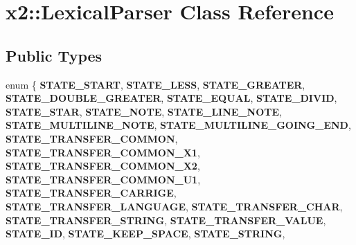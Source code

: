 \hypertarget{classx2_1_1_lexical_parser}{}\section{x2\+:\+:Lexical\+Parser Class Reference}
\label{classx2_1_1_lexical_parser}
\subsection*{Public Types}
\begin{DoxyCompactItemize}
\item 
\mbox{\label{classx2_1_1_lexical_parser_a0349435d24793ac365f23265c9ef49f1}} 
enum \{ \newline
{\bfseries S\+T\+A\+T\+E\+\_\+\+S\+T\+A\+RT}, 
{\bfseries S\+T\+A\+T\+E\+\_\+\+L\+E\+SS}, 
{\bfseries S\+T\+A\+T\+E\+\_\+\+G\+R\+E\+A\+T\+ER}, 
{\bfseries S\+T\+A\+T\+E\+\_\+\+D\+O\+U\+B\+L\+E\+\_\+\+G\+R\+E\+A\+T\+ER}, 
\newline
{\bfseries S\+T\+A\+T\+E\+\_\+\+E\+Q\+U\+AL}, 
{\bfseries S\+T\+A\+T\+E\+\_\+\+D\+I\+V\+ID}, 
{\bfseries S\+T\+A\+T\+E\+\_\+\+S\+T\+AR}, 
{\bfseries S\+T\+A\+T\+E\+\_\+\+N\+O\+TE}, 
\newline
{\bfseries S\+T\+A\+T\+E\+\_\+\+L\+I\+N\+E\+\_\+\+N\+O\+TE}, 
{\bfseries S\+T\+A\+T\+E\+\_\+\+M\+U\+L\+T\+I\+L\+I\+N\+E\+\_\+\+N\+O\+TE}, 
{\bfseries S\+T\+A\+T\+E\+\_\+\+M\+U\+L\+T\+I\+L\+I\+N\+E\+\_\+\+G\+O\+I\+N\+G\+\_\+\+E\+ND}, 
{\bfseries S\+T\+A\+T\+E\+\_\+\+T\+R\+A\+N\+S\+F\+E\+R\+\_\+\+C\+O\+M\+M\+ON}, 
\newline
{\bfseries S\+T\+A\+T\+E\+\_\+\+T\+R\+A\+N\+S\+F\+E\+R\+\_\+\+C\+O\+M\+M\+O\+N\+\_\+\+X1}, 
{\bfseries S\+T\+A\+T\+E\+\_\+\+T\+R\+A\+N\+S\+F\+E\+R\+\_\+\+C\+O\+M\+M\+O\+N\+\_\+\+X2}, 
{\bfseries S\+T\+A\+T\+E\+\_\+\+T\+R\+A\+N\+S\+F\+E\+R\+\_\+\+C\+O\+M\+M\+O\+N\+\_\+\+U1}, 
{\bfseries S\+T\+A\+T\+E\+\_\+\+T\+R\+A\+N\+S\+F\+E\+R\+\_\+\+C\+A\+R\+R\+I\+GE}, 
\newline
{\bfseries S\+T\+A\+T\+E\+\_\+\+T\+R\+A\+N\+S\+F\+E\+R\+\_\+\+L\+A\+N\+G\+U\+A\+GE}, 
{\bfseries S\+T\+A\+T\+E\+\_\+\+T\+R\+A\+N\+S\+F\+E\+R\+\_\+\+C\+H\+AR}, 
{\bfseries S\+T\+A\+T\+E\+\_\+\+T\+R\+A\+N\+S\+F\+E\+R\+\_\+\+S\+T\+R\+I\+NG}, 
{\bfseries S\+T\+A\+T\+E\+\_\+\+T\+R\+A\+N\+S\+F\+E\+R\+\_\+\+V\+A\+L\+UE}, 
\newline
{\bfseries S\+T\+A\+T\+E\+\_\+\+ID}, 
{\bfseries S\+T\+A\+T\+E\+\_\+\+K\+E\+E\+P\+\_\+\+S\+P\+A\+CE}, 
{\bfseries S\+T\+A\+T\+E\+\_\+\+S\+T\+R\+I\+NG}, 

\end{DoxyCompactItemize}
